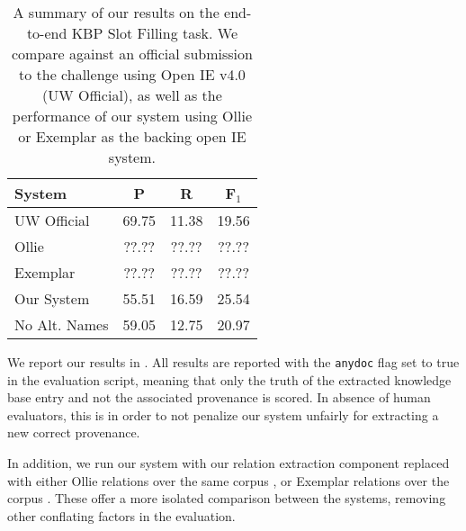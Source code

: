 \begin{table}
\begin{center}
\begin{tabular}{l|cc:c}
\textbf{System} & \textbf{P} & \textbf{R} & \textbf{F$_1$} \\
\hline
UW Official   & 69.75 & 11.38 & 19.56 \\
Ollie         & ??.?? & ??.?? & ??.?? \\
Exemplar      & ??.?? & ??.?? & ??.?? \\
\hline
Our System    & 55.51 & 16.59 & 25.54 \\
No Alt. Names & 59.05 & 12.75 & 20.97 \\
\end{tabular}
\end{center}
\caption{\label{tab:results}
A summary of our results on the end-to-end KBP Slot Filling task.
We compare against an official submission to the challenge using
  Open IE v4.0 (UW Official), as well as the performance of our system
  using Ollie or Exemplar as the backing open IE system.
}
\end{table}

We report our results in .
All results are reported with the \texttt{anydoc} flag set to true
  in the evaluation script, meaning that only the truth of the extracted
  knowledge base entry and not the associated provenance is scored.
In absence of human evaluators, this is in order to not penalize our 
  system unfairly for extracting a new correct provenance.

In addition, we run our system with our relation extraction component replaced
  with either Ollie relations over the same corpus \cite{key:2012mausam-ollie},
  or Exemplar relations over the corpus \cite{key:2013mesquita-exemplar}.
These offer a more isolated comparison between the systems, removing
  other conflating factors in the evaluation.

